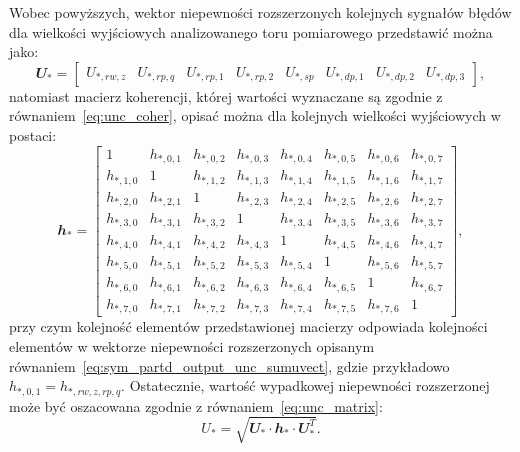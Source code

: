 Wobec powyższych, wektor niepewności rozszerzonych kolejnych sygnałów błędów dla wielkości wyjściowych analizowanego toru pomiarowego przedstawić można jako:
\begin{equation}
\mathbfit{U}_{*} =
\begin{bmatrix}
U_{*,rw,z} & U_{*,rp,q} & U_{*,rp,1} & U_{*,rp,2} & U_{*,sp} & U_{*,dp,1} & U_{*,dp,2} & U_{*,dp,3}
\end{bmatrix}
\label{eq:sym_partd_output_unc_sumuvect},
\end{equation}
natomiast macierz koherencji, której wartości wyznaczane są zgodnie z równaniem~\eqref{eq:unc_coher}, opisać można dla kolejnych wielkości wyjściowych w postaci:
\begin{equation}
\mathbfit{h}_{*} =
\begin{bmatrix}
1 & h_{*,0,1} & h_{*,0,2} & h_{*,0,3} & h_{*,0,4} & h_{*,0,5} & h_{*,0,6} & h_{*,0,7} \\
h_{*,1,0} & 1 & h_{*,1,2} & h_{*,1,3} & h_{*,1,4} & h_{*,1,5} & h_{*,1,6} & h_{*,1,7} \\
h_{*,2,0} & h_{*,2,1} & 1 & h_{*,2,3} & h_{*,2,4} & h_{*,2,5} & h_{*,2,6} & h_{*,2,7} \\
h_{*,3,0} & h_{*,3,1} & h_{*,3,2} & 1 & h_{*,3,4} & h_{*,3,5} & h_{*,3,6} & h_{*,3,7} \\
h_{*,4,0} & h_{*,4,1} & h_{*,4,2} & h_{*,4,3} & 1 & h_{*,4,5} & h_{*,4,6} & h_{*,4,7} \\
h_{*,5,0} & h_{*,5,1} & h_{*,5,2} & h_{*,5,3} & h_{*,5,4} & 1 & h_{*,5,6} & h_{*,5,7} \\
h_{*,6,0} & h_{*,6,1} & h_{*,6,2} & h_{*,6,3} & h_{*,6,4} & h_{*,6,5} & 1 & h_{*,6,7} \\
h_{*,7,0} & h_{*,7,1} & h_{*,7,2} & h_{*,7,3} & h_{*,7,4} & h_{*,7,5} & h_{*,7,6} & 1
\end{bmatrix}
\label{eq:sym_partd_output_unc_cohermat},
\end{equation}
przy czym kolejność elementów przedstawionej macierzy odpowiada kolejności elementów w wektorze niepewności rozszerzonych opisanym równaniem~\eqref{eq:sym_partd_output_unc_sumuvect}, gdzie przykładowo $h_{*,0,1} = h_{*,rw,z,rp,q}$. Ostatecznie, wartość wypadkowej niepewności rozszerzonej może być oszacowana zgodnie z równaniem~\eqref{eq:unc_matrix}:
\begin{equation}
U_{*} = \sqrt{\mathbfit{U}_{*} \cdot \mathbfit{h}_{*} \cdot \mathbfit{U}_{*}^{T}} \label{eq:sym_partd_output_unc_totalmat}.
\end{equation}

